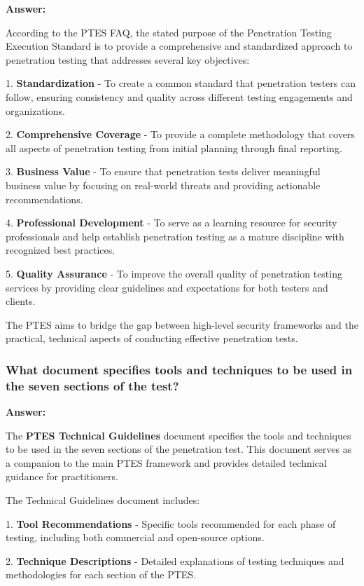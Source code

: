 \documentclass[12pt,a4paper]{article}
\begin{document}
\textbf{Answer:}

According to the PTES FAQ, the stated purpose of the Penetration Testing Execution Standard is to provide a comprehensive and standardized approach to penetration testing that addresses several key objectives:

1. \textbf{Standardization} - To create a common standard that penetration testers can follow, ensuring consistency and quality across different testing engagements and organizations.

2. \textbf{Comprehensive Coverage} - To provide a complete methodology that covers all aspects of penetration testing from initial planning through final reporting.

3. \textbf{Business Value} - To ensure that penetration tests deliver meaningful business value by focusing on real-world threats and providing actionable recommendations.

4. \textbf{Professional Development} - To serve as a learning resource for security professionals and help establish penetration testing as a mature discipline with recognized best practices.

5. \textbf{Quality Assurance} - To improve the overall quality of penetration testing services by providing clear guidelines and expectations for both testers and clients.

The PTES aims to bridge the gap between high-level security frameworks and the practical, technical aspects of conducting effective penetration tests.

\subsubsection{What document specifies tools and techniques to be used in the seven sections of the test?}

\textbf{Answer:}

The \textbf{PTES Technical Guidelines} document specifies the tools and techniques to be used in the seven sections of the penetration test. This document serves as a companion to the main PTES framework and provides detailed technical guidance for practitioners.

The Technical Guidelines document includes:

1. \textbf{Tool Recommendations} - Specific tools recommended for each phase of testing, including both commercial and open-source options.

2. \textbf{Technique Descriptions} - Detailed explanations of testing techniques and methodologies for each section of the PTES.
\end{document}
